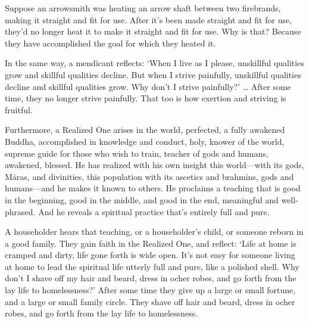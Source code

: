 \documentclass[12pt,openany]{book}%
\begin{document}
Suppose an arrowsmith was heating an arrow shaft between two firebrands, making it straight and fit for use. After it’s been made straight and fit for use, they’d no longer heat it to make it straight and fit for use. Why is that? Because they have accomplished the goal for which they heated it. 

In the same way, a mendicant reflects: ‘When I live as I please, unskillful qualities grow and skillful qualities decline. But when I strive painfully, unskillful qualities decline and skillful qualities grow. Why don’t I strive painfully?’ … After some time, they no longer strive painfully. That too is how exertion and striving is fruitful. 

Furthermore, a Realized One arises in the world, perfected, a fully awakened Buddha, accomplished in knowledge and conduct, holy, knower of the world, supreme guide for those who wish to train, teacher of gods and humans, awakened, blessed. He has realized with his own insight this world—with its gods, \textsanskrit{Māras}, and divinities, this population with its ascetics and brahmins, gods and humans—and he makes it known to others. He proclaims a teaching that is good in the beginning, good in the middle, and good in the end, meaningful and well-phrased. And he reveals a spiritual practice that’s entirely full and pure. 

A householder hears that teaching, or a householder’s child, or someone reborn in a good family. They gain faith in the Realized One, and reflect: ‘Life at home is cramped and dirty, life gone forth is wide open. It’s not easy for someone living at home to lead the spiritual life utterly full and pure, like a polished shell. Why don’t I shave off my hair and beard, dress in ocher robes, and go forth from the lay life to homelessness?’ After some time they give up a large or small fortune, and a large or small family circle. They shave off hair and beard, dress in ocher robes, and go forth from the lay life to homelessness. 
\end{document}
